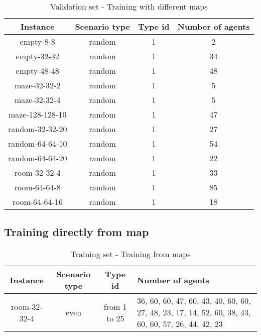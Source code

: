 \begin{table}[!ht]
    \centering
    \caption{Validation set - Training with different maps}
    \begin{tabular}{|c|c|c|c|}
        \hline
        Instance & Scenario type & Type id & Number of agents \\
        \hline
        empty-8-8 & random & 1 & 2 \\
        \hline
        empty-32-32 & random & 1 & 34 \\
        \hline
        empty-48-48 & random & 1 & 48 \\
        \hline
        maze-32-32-2 & random & 1 & 5 \\
        \hline
        maze-32-32-4 & random & 1 & 5 \\
        \hline
        maze-128-128-10 & random & 1 & 47 \\
        \hline
        random-32-32-20 & random & 1 & 27 \\
        \hline
        random-64-64-10 & random & 1 & 54 \\
        \hline
        random-64-64-20 & random & 1 & 22 \\
        \hline
        room-32-32-4 & random & 1 & 33 \\
        \hline
        room-64-64-8 & random & 1 & 85 \\
        \hline
        room-64-64-16 & random & 1 & 18 \\
        \hline
    \end{tabular}
    \label{tab:val-set-features}
\end{table}

\subsection{Training directly from map}

\begin{table}[!ht]
    \centering
    \caption{Training set - Training from maps}
    \begin{tabular}{|c|c|c|p{6cm}|}
        \hline
        Instance & Scenario type & Type id & Number of agents \\
        \hline
        room-32-32-4 & even & from 1 to 25 & 36, 60, 60, 47, 60, 43, 40, 60, 60, 27, 48, 23, 17, 14, 52, 60, 38, 43, 60, 60, 57, 26, 44, 42, 23 \\
        \hline
    \end{tabular}
    \label{tab:train-set-map}
\end{table}

